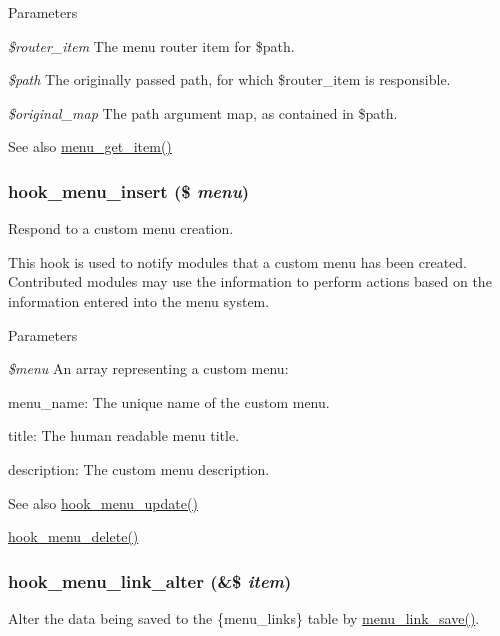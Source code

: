 \begin{DoxyParams}{Parameters}
\item[{\em \$router\_\-item}]The menu router item for \$path. \item[{\em \$path}]The originally passed path, for which \$router\_\-item is responsible. \item[{\em \$original\_\-map}]The path argument map, as contained in \$path.\end{DoxyParams}
\begin{DoxySeeAlso}{See also}
\hyperlink{group__menu_ga855b1ca6ef9e44eb6107a2b9d0f581df}{menu\_\-get\_\-item()} 
\end{DoxySeeAlso}
\hypertarget{group__hooks_ga8459a7c61564db3b5ccd53d39ada1555}{
\subsubsection[{hook\_\-menu\_\-insert}]{\setlength{\rightskip}{0pt plus 5cm}hook\_\-menu\_\-insert (\$ {\em menu})}}
\label{group__hooks_ga8459a7c61564db3b5ccd53d39ada1555}
Respond to a custom menu creation.

This hook is used to notify modules that a custom menu has been created. Contributed modules may use the information to perform actions based on the information entered into the menu system.


\begin{DoxyParams}{Parameters}
\item[{\em \$menu}]An array representing a custom menu:
\begin{DoxyItemize}
\item menu\_\-name: The unique name of the custom menu.
\item title: The human readable menu title.
\item description: The custom menu description.
\end{DoxyItemize}\end{DoxyParams}
\begin{DoxySeeAlso}{See also}
\hyperlink{group__hooks_ga21331911abfc25de5921af04a76a0921}{hook\_\-menu\_\-update()} 

\hyperlink{group__hooks_gaef8c43d600c4efbae913dc3841a93199}{hook\_\-menu\_\-delete()} 
\end{DoxySeeAlso}
\hypertarget{group__hooks_ga53f6d87f599e7f585ca84a7e0874df81}{
\subsubsection[{hook\_\-menu\_\-link\_\-alter}]{\setlength{\rightskip}{0pt plus 5cm}hook\_\-menu\_\-link\_\-alter (\&\$ {\em item})}}
\label{group__hooks_ga53f6d87f599e7f585ca84a7e0874df81}
Alter the data being saved to the \{menu\_\-links\} table by \hyperlink{group__menu_ga133b177fee00b678a19afba18fb81ebc}{menu\_\-link\_\-save()}.


